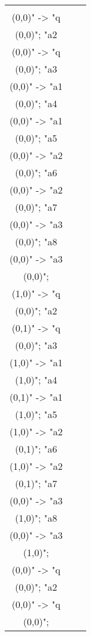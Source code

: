 \documentclass[12pt]{article}
\theoremstyle{defi}
\theoremstyle{not}
\theoremstyle{prob}
\begin{document}
\begin{figure}
\centering
\begin{tabular}{ccc}
  \begin{tikzpicture}[>=stealth]
  \graph [ layered layout, nodes = {scale=0.75, align=center} ] {
  "a1\\ (0,0)" -> "q\\ (0,0)";
  "a2\\ (0,0)" -> "q\\ (0,0)";
  "a3\\ (0,0)" -> "a1\\ (0,0)";
  "a4\\ (0,0)" -> "a1\\ (0,0)";
  "a5\\ (0,0)" -> "a2\\ (0,0)";
  "a6\\ (0,0)" -> "a2\\ (0,0)";
  "a7\\ (0,0)" -> "a3\\ (0,0)";
  "a8\\ (0,0)" -> "a3\\ (0,0)";
  };
  \end{tikzpicture} &
  \begin{tikzpicture}[>=stealth]
  \graph [ layered layout, nodes = {scale=0.75, align=center} ] {
  "a1\\ (1,0)" -> "q\\ (0,0)";
  "a2\\ (0,1)" -> "q\\ (0,0)";
  "a3\\ (1,0)" -> "a1\\ (1,0)";
  "a4\\ (0,1)" -> "a1\\ (1,0)";
  "a5\\ (1,0)" -> "a2\\ (0,1)";
  "a6\\ (1,0)" -> "a2\\ (0,1)";
  "a7\\ (0,0)" -> "a3\\ (1,0)";
  "a8\\ (0,0)" -> "a3\\ (1,0)";
  };
  \end{tikzpicture} &
  \begin{tikzpicture}[>=stealth]
  \graph [ layered layout, nodes = {scale=0.75, align=center} ] {
  "a1\\ (0,0)" -> "q\\ (0,0)";
  "a2\\ (0,0)" -> "q\\ (0,0)";
}
\end{tikzpicture}
\end{tabular}
\end{figure}
\end{document}
